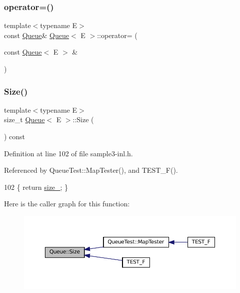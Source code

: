 \subsubsection{\texorpdfstring{operator=()}{operator=()}}
{\footnotesize\ttfamily template$<$typename E$>$ \\
const \hyperlink{classQueue}{Queue}\& \hyperlink{classQueue}{Queue}$<$ E $>$\+::operator= (\begin{DoxyParamCaption}\item[{const \hyperlink{classQueue}{Queue}$<$ E $>$ \&}]{ }\end{DoxyParamCaption})\hspace{0.3cm}{\ttfamily [private]}}

\mbox{\label{classQueue_abc4d78b5f66041011c5590bf703847b0}} 
\subsubsection{\texorpdfstring{Size()}{Size()}}
{\footnotesize\ttfamily template$<$typename E$>$ \\
size\+\_\+t \hyperlink{classQueue}{Queue}$<$ E $>$\+::Size (\begin{DoxyParamCaption}{ }\end{DoxyParamCaption}) const\hspace{0.3cm}{\ttfamily [inline]}}



Definition at line 102 of file sample3-\/inl.\+h.



Referenced by Queue\+Test\+::\+Map\+Tester(), and T\+E\+S\+T\+\_\+\+F().


\begin{DoxyCode}
102 \{ \textcolor{keywordflow}{return} \hyperlink{classQueue_a7ac3c0717d894e1aecc56f4ddb35c7ea}{size\_}; \}
\end{DoxyCode}
Here is the caller graph for this function\+:
\nopagebreak
\begin{figure}[H]
\begin{center}
\leavevmode
\includegraphics[width=350pt]{classQueue_abc4d78b5f66041011c5590bf703847b0_icgraph}
\end{center}
\end{figure}


